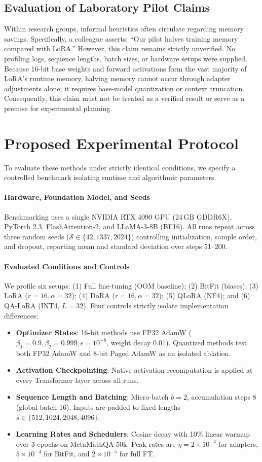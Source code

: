 \documentclass[11pt,a4paper]{article}
\begin{document}
\subsection{Evaluation of Laboratory Pilot Claims}
Within research groups, informal heuristics often circulate regarding memory savings. Specifically, a colleague asserts: ``Our pilot halves training memory compared with LoRA.'' However, this claim remains strictly unverified. No profiling logs, sequence lengths, batch sizes, or hardware setups were supplied. Because 16-bit base weights and forward activations form the vast majority of LoRA's runtime memory, halving memory cannot occur through adapter adjustments alone; it requires base-model quantization or context truncation. Consequently, this claim must not be treated as a verified result or serve as a premise for experimental planning.

\section{Proposed Experimental Protocol}
To evaluate these methods under strictly identical conditions, we specify a controlled benchmark isolating runtime and algorithmic parameters.

\paragraph{Hardware, Foundation Model, and Seeds}
Benchmarking uses a single NVIDIA RTX 4090 GPU (24\,GB GDDR6X), PyTorch 2.3, FlashAttention-2, and LLaMA-3-8B (BF16). All runs repeat across three random seeds ($\mathcal{S} \in \{42, 1337, 2024\}$) controlling initialization, sample order, and dropout, reporting mean and standard deviation over steps 51--200.

\paragraph{Evaluated Conditions and Controls}
We profile six setups: (1) Full fine-tuning (OOM baseline); (2) BitFit (biases); (3) LoRA ($r=16, \alpha=32$); (4) DoRA ($r=16, \alpha=32$); (5) QLoRA (NF4); and (6) QA-LoRA (INT4, $L=32$). Four controls strictly isolate implementation differences:
\begin{itemize}
    \item \textbf{Optimizer States}: 16-bit methods use FP32 AdamW ($\beta_1=0.9, \beta_2=0.999, \epsilon=10^{-8}$, weight decay 0.01). Quantized methods test both FP32 AdamW and 8-bit Paged AdamW as an isolated ablation.
    \item \textbf{Activation Checkpointing}: Native activation recomputation is applied at every Transformer layer across all runs.
    \item \textbf{Sequence Length and Batching}: Micro-batch $b=2$, accumulation steps 8 (global batch 16). Inputs are padded to fixed lengths $s \in \{512, 1024, 2048, 4096\}$.
    \item \textbf{Learning Rates and Schedulers}: Cosine decay with 10\% linear warmup over 3 epochs on MetaMathQA-50k. Peak rates are $\eta=2\times 10^{-4}$ for adapters, $5\times 10^{-4}$ for BitFit, and $2\times 10^{-5}$ for full FT.
\end{itemize}
\end{document}

